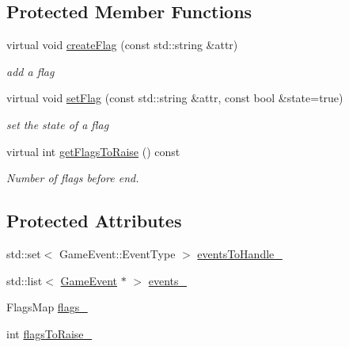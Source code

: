\subsection*{Protected Member Functions}
\begin{DoxyCompactItemize}
\item 
virtual void \hyperlink{class_victory_handler_ae7ff58aa1a0d461863e6c3ae16f786ca}{create\+Flag} (const std\+::string \&attr)\hypertarget{class_victory_handler_ae7ff58aa1a0d461863e6c3ae16f786ca}{}\label{class_victory_handler_ae7ff58aa1a0d461863e6c3ae16f786ca}

\begin{DoxyCompactList}\small\item\em add a flag \end{DoxyCompactList}\item 
virtual void \hyperlink{class_victory_handler_abf2f8c2d2bc9df0d4b2ed0856db67f73}{set\+Flag} (const std\+::string \&attr, const bool \&state=true)\hypertarget{class_victory_handler_abf2f8c2d2bc9df0d4b2ed0856db67f73}{}\label{class_victory_handler_abf2f8c2d2bc9df0d4b2ed0856db67f73}

\begin{DoxyCompactList}\small\item\em set the state of a flag \end{DoxyCompactList}\item 
virtual int \hyperlink{class_victory_handler_a35263f72fac35cea0ec3616f8d51cf61}{get\+Flags\+To\+Raise} () const \hypertarget{class_victory_handler_a35263f72fac35cea0ec3616f8d51cf61}{}\label{class_victory_handler_a35263f72fac35cea0ec3616f8d51cf61}

\begin{DoxyCompactList}\small\item\em Number of flags before end. \end{DoxyCompactList}\end{DoxyCompactItemize}
\subsection*{Protected Attributes}
\begin{DoxyCompactItemize}
\item 
std\+::set$<$ Game\+Event\+::\+Event\+Type $>$ \hyperlink{class_victory_handler_ad77dbdde03da886a905c4daa274c4a0a}{events\+To\+Handle\+\_\+}
\item 
std\+::list$<$ \hyperlink{class_game_event}{Game\+Event} $\ast$ $>$ \hyperlink{class_victory_handler_a632e68ca2b6ffd913d5e27fc33f08123}{events\+\_\+}
\item 
Flags\+Map \hyperlink{class_victory_handler_a01fcaa39ade4234c761326e1f262b822}{flags\+\_\+}
\item 
int \hyperlink{class_victory_handler_ad692ca6b37d7e31e0b1bb8903a30d4f0}{flags\+To\+Raise\+\_\+}
\end{DoxyCompactItemize}


